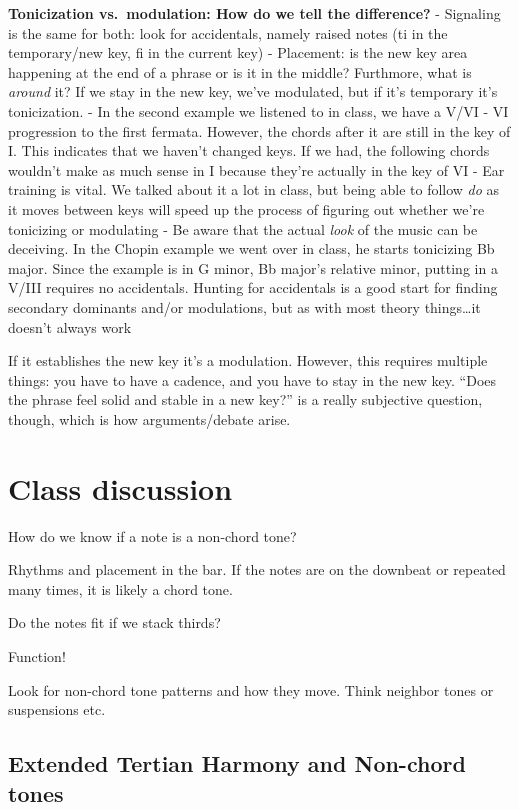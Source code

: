 \documentclass{book}
\begin{document}
\textbf{Tonicization vs.~modulation: How do we tell the difference?} -
Signaling is the same for both: look for accidentals, namely raised notes (ti
in the temporary/new key, fi in the current key) - Placement: is the new key
area happening at the end of a phrase or is it in the middle? Furthmore, what
is \emph{around} it? If we stay in the new key, we've modulated, but if it's
temporary it's tonicization. - In the second example we listened to in class,
we have a V/VI - VI progression to the first fermata. However, the chords
after it are still in the key of I. This indicates that we haven't changed
keys. If we had, the following chords wouldn't make as much sense in I because
they're actually in the key of VI - Ear training is vital. We talked about it
a lot in class, but being able to follow \emph{do} as it moves between keys
will speed up the process of figuring out whether we're tonicizing or
modulating - Be aware that the actual \emph{look} of the music can be
deceiving. In the Chopin example we went over in class, he starts tonicizing
Bb major. Since the example is in G minor, Bb major's relative minor, putting
in a V/III requires no accidentals. Hunting for accidentals is a good start
for finding secondary dominants and/or modulations, but as with most theory
things\ldots it doesn't always work

If it establishes the new key it's a modulation. However, this requires
multiple things: you have to have a cadence, and you have to stay in the new
key. ``Does the phrase feel solid and stable in a new key?'' is a really
subjective question, though, which is how arguments/debate arise.

\hypertarget{class-discussion-17}{%
\chapter{Class discussion}\label{class-discussion-17}}

How do we know if a note is a non-chord tone?

Rhythms and placement in the bar. If the notes are on the downbeat or repeated
many times, it is likely a chord tone.

Do the notes fit if we stack thirds?

Function!

Look for non-chord tone patterns and how they move. Think neighbor tones or
suspensions etc.

\hypertarget{extended-tertian-harmony-and-non-chord-tones}{%
\section{Extended Tertian Harmony and Non-chord
tones}\label{extended-tertian-harmony-and-non-chord-tones}}
\end{document}
